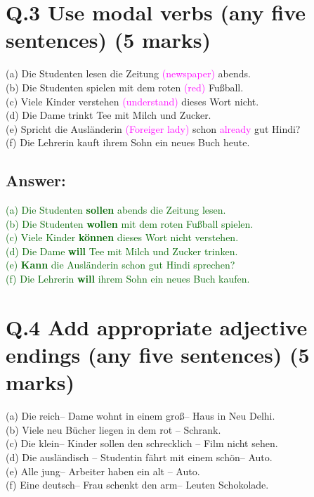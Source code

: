 \documentclass[a4paper,12pt]{article}
\begin{document}
\section*{Q.3 Use modal verbs (any five sentences) (5 marks)}

(a) Die Studenten lesen die Zeitung \textcolor{magenta}{(newspaper)} abends.\\
(b) Die Studenten spielen mit dem roten \textcolor{magenta}{(red)} Fußball.\\
(c) Viele Kinder verstehen \textcolor{magenta}{(understand)} dieses Wort nicht.\\
(d) Die Dame trinkt Tee mit Milch und Zucker.\\
(e) Spricht die Ausländerin \textcolor{magenta}{(Foreiger lady)} schon \textcolor{magenta}{already} gut Hindi?\\
(f) Die Lehrerin kauft ihrem Sohn ein neues Buch heute.

\subsection*{Answer:}
\textcolor{darkgreen}{(a) Die Studenten \textbf{sollen} abends die Zeitung lesen.}\\
\textcolor{darkgreen}{(b) Die Studenten \textbf{wollen} mit dem roten Fußball spielen.}\\
\textcolor{darkgreen}{(c) Viele Kinder \textbf{können} dieses Wort nicht verstehen.}\\
\textcolor{darkgreen}{(d) Die Dame \textbf{will} Tee mit Milch und Zucker trinken.}\\
\textcolor{darkgreen}{(e) \textbf{Kann} die Ausländerin schon gut Hindi sprechen?}\\
\textcolor{darkgreen}{(f) Die Lehrerin \textbf{will} ihrem Sohn ein neues Buch kaufen.}



\vspace{0.5cm}

\section*{Q.4 Add appropriate adjective endings (any five sentences) (5 marks)}

(a) Die reich-- Dame wohnt in einem groß-- Haus in Neu Delhi.\\
(b) Viele neu Bücher liegen in dem rot -- Schrank.\\
(c) Die klein-- Kinder sollen den schrecklich -- Film nicht sehen.\\
(d) Die ausländisch -- Studentin fährt mit einem schön-- Auto.\\
(e) Alle jung-- Arbeiter haben ein alt -- Auto.\\
(f) Eine deutsch-- Frau schenkt den arm-- Leuten Schokolade.
\end{document}
